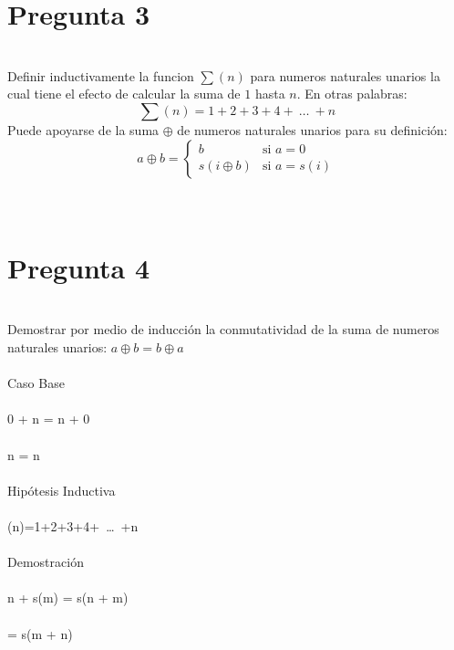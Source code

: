 \documentclass{article}
\begin{document}
 \section{Pregunta 3}
 \\
 Definir inductivamente la funcion $\sum(n)$ para numeros naturales unarios la cual tiene
el efecto de calcular la suma de $1$ hasta $n$. En otras palabras:
\[
        \sum(n)=1+2+3+4+\ \ldots\ +n
\]
Puede apoyarse de la suma $\oplus$ de numeros naturales unarios para su definici\'on:
\[
        a\oplus b =
                \left\{
                        \begin{array}{ll}
                                b  & \mbox{si } a = 0 \\
                                s(i\oplus b) & \mbox{si } a = s(i)
                        \end{array}
                \right.
\]
\\
\\
\section{Pregunta 4}
\\
Demostrar por medio de inducci\'on la conmutatividad de la suma de
numeros naturales unarios: $a\oplus b = b\oplus a$
\\
\\
Caso Base
\\
\\
0 + n = n + 0
\\
\\
n = n
\\
\\
Hipótesis Inductiva
\\
\\
\sum(n)=1+2+3+4+\ \ldots\ +n
\\
\\
Demostración
\\
\\
n + s(m) = s(n + m) 
\\
\\
= s(m + n)
\\
\\
\\
\\
\\
\\
\end{document}
